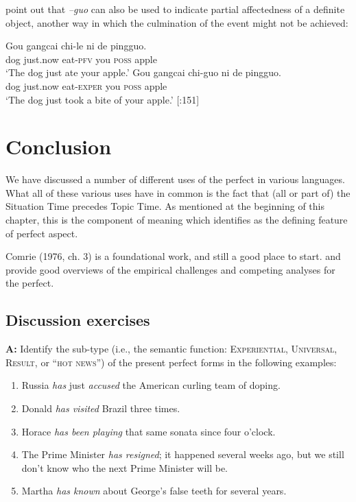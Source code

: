 \citet{HuangDavis1989} point out that \textit{–guo} can also be used to indicate partial affectedness of a definite object, another way in which the culmination of the event might not be achieved:


\ea
\ea \gll  Gou  gangcai  chi-le  ni  de  pingguo.\\
dog  just.now  eat-\textsc{pfv}  you  \textsc{poss}  apple\\
\glt ‘The dog just ate your apple.’
\ex \gll  Gou  gangcai  chi-guo  ni  de  pingguo.\\
dog  just.now  eat-\textsc{exper}  you  \textsc{poss}  apple\\
\glt ‘The dog just took a bite of your apple.’  [\citealt{HuangDavis1989}:151]
\z \z

\section{Conclusion}\label{sec:22.7}

We have discussed a number of different uses of the perfect in various languages. What all of these various uses have in common is the fact that (all or part of) the Situation Time precedes Topic Time. As mentioned at the beginning of this chapter, this is the component of meaning which \citet{Klein1992} identifies as the defining feature of perfect aspect.



\furtherreading



Comrie (1976, ch. 3) is a foundational work, and still a good place to start. \citet{Portner2011} and \citet{Ritz2012} provide good overviews of the empirical challenges and competing analyses for the perfect.


\subsection*{Discussion exercises}

\textbf{A:} Identify the sub-type (i.e., the semantic function: \textsc{Experiential, Universal, Result}, or “\textsc{hot news}”) of the present perfect forms in the following examples:

\begin{enumerate}
\item Russia \textit{has} just \textit{accused} the American curling team of doping.
\item Donald \textit{has visited} Brazil three times.
\item Horace \textit{has been playing} that same sonata since four o’clock.
\item The Prime Minister \textit{has resigned}; it happened several weeks ago, but we still don’t know who the next Prime Minister will be.
\item Martha \textit{has known} about George’s false teeth for several years.
\end{enumerate}
